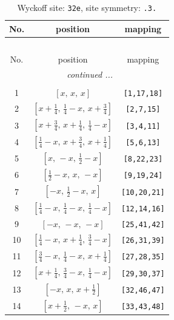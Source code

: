 \documentclass[fleqn,8pt]{jsarticle}
\begin{document}
\renewcommand{\arraystretch}{1.2}
\begin{longtable}{ccc}
\caption{Wyckoff site: {\tt 32e}, site symmetry: {\tt .3.}}
 \\
 \hline \hline
No. & position & mapping \\ \hline \endfirsthead

\multicolumn{2}{l}{\tablename\ \thetable{}} \\
 \hline \hline
No. & position & mapping \\ \hline \endhead

 \hline \hline
\multicolumn{2}{r}{\footnotesize\it continued ...} \\ \endfoot

 \hline \hline
\multicolumn{2}{r}{} \\ \endlastfoot

1 & $\left[ x,\, x,\, x \right]$ & {\tt [1,17,18]} \\ \hline
2 & $\left[ x + \frac{1}{4},\, \frac{1}{4} - x,\, x + \frac{3}{4} \right]$ & {\tt [2,7,15]} \\ \hline
3 & $\left[ x + \frac{3}{4},\, x + \frac{1}{4},\, \frac{1}{4} - x \right]$ & {\tt [3,4,11]} \\ \hline
4 & $\left[ \frac{1}{4} - x,\, x + \frac{3}{4},\, x + \frac{1}{4} \right]$ & {\tt [5,6,13]} \\ \hline
5 & $\left[ x,\, - x,\, \frac{1}{2} - x \right]$ & {\tt [8,22,23]} \\ \hline
6 & $\left[ \frac{1}{2} - x,\, x,\, - x \right]$ & {\tt [9,19,24]} \\ \hline
7 & $\left[ - x,\, \frac{1}{2} - x,\, x \right]$ & {\tt [10,20,21]} \\ \hline
8 & $\left[ \frac{1}{4} - x,\, \frac{1}{4} - x,\, \frac{1}{4} - x \right]$ & {\tt [12,14,16]} \\ \hline
9 & $\left[ - x,\, - x,\, - x \right]$ & {\tt [25,41,42]} \\ \hline
10 & $\left[ \frac{1}{4} - x,\, x + \frac{1}{4},\, \frac{3}{4} - x \right]$ & {\tt [26,31,39]} \\ \hline
11 & $\left[ \frac{3}{4} - x,\, \frac{1}{4} - x,\, x + \frac{1}{4} \right]$ & {\tt [27,28,35]} \\ \hline
12 & $\left[ x + \frac{1}{4},\, \frac{3}{4} - x,\, \frac{1}{4} - x \right]$ & {\tt [29,30,37]} \\ \hline
13 & $\left[ - x,\, x,\, x + \frac{1}{2} \right]$ & {\tt [32,46,47]} \\ \hline
14 & $\left[ x + \frac{1}{2},\, - x,\, x \right]$ & {\tt [33,43,48]} \\ \hline

\end{longtable}
\end{document}
